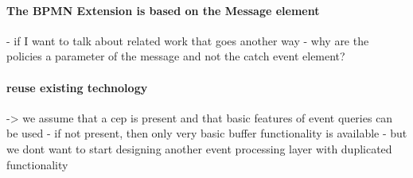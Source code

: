 \paragraph{The BPMN Extension is based on the Message element}
- if I want to talk about related work that goes another way
- why are the policies a parameter of the message and not the catch event element?

\paragraph{reuse existing technology}
-> we assume that a cep is present and that basic features of event queries can be used
- if not present, then only very basic buffer functionality is available
- but we dont want to start designing another event processing layer with duplicated functionality

